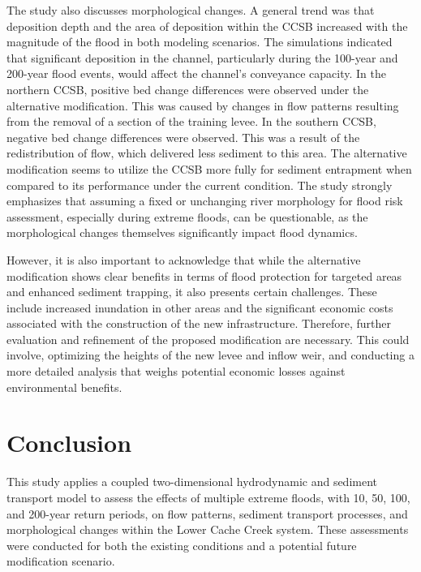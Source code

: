 \documentclass[a4paper, 11pt]{article}
\begin{document}
\hspace*{0.5cm}The study also discusses morphological changes. A general trend was that deposition depth and the area of deposition within the CCSB increased with the magnitude of the flood in both modeling scenarios. The simulations indicated that significant deposition in the channel, particularly during the 100-year and 200-year flood events, would affect the channel's conveyance capacity. In the northern CCSB, positive bed change differences were observed under the alternative modification. This was caused by changes in flow patterns resulting from the removal of a section of the training levee. In the southern CCSB, negative bed change differences were observed. This was a result of the redistribution of flow, which delivered less sediment to this area. The alternative modification seems to utilize the CCSB more fully for sediment entrapment when compared to its performance under the current condition. The study strongly emphasizes that assuming a fixed or unchanging river morphology for flood risk assessment, especially during extreme floods, can be questionable, as the morphological changes themselves significantly impact flood dynamics.

\hspace*{0.5cm}However, it is also important to acknowledge that while the alternative modification shows clear benefits in terms of flood protection for targeted areas and enhanced sediment trapping, it also presents certain challenges. These include increased inundation in other areas and the significant economic costs associated with the construction of the new infrastructure. Therefore, further evaluation and refinement of the proposed modification are necessary. This could involve, optimizing the heights of the new levee and inflow weir, and conducting a more detailed analysis that weighs potential economic losses against environmental benefits.

\section{Conclusion}
\hspace*{0.5cm}This study applies a coupled two-dimensional hydrodynamic and sediment transport model to assess the effects of multiple extreme floods, with 10, 50, 100, and 200-year return periods, on flow patterns, sediment transport processes, and morphological changes within the Lower Cache Creek system. These assessments were conducted for both the existing conditions and a potential future modification scenario.
\end{document}
